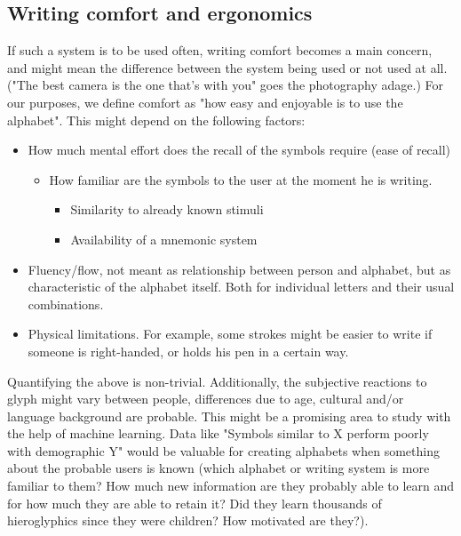 \documentclass{vgtc}                          %
\begin{document}
\subsection{Writing comfort and ergonomics}
If such a system is to be used often, writing comfort becomes a main concern, and might mean the difference between the system being used or not used at all. 
("The best camera is the one that's with you" goes the photography adage.) %
For our purposes, we define comfort as "how easy and enjoyable is to use the alphabet". This might depend on the following factors:
\begin{itemize}
        \item How much mental effort does the recall of the symbols require (ease of recall)
                \begin{itemize}
                        \item How familiar are the symbols to the user at the moment he is writing. 
                                \begin{itemize}
                                        \item Similarity to already known stimuli
                                        \item Availability of a mnemonic system
                                \end{itemize}
                \end{itemize}
        \item Fluency/flow, not meant as relationship between person and alphabet, but as characteristic of the alphabet itself. Both for individual letters and their usual combinations.
        \item Physical limitations. For example, some strokes might be easier to write if someone is right-handed, or holds his pen in a certain way.
\end{itemize}


Quantifying the above is non-trivial.  Additionally, the subjective reactions to glyph might vary between people, differences due to age, cultural and/or language background are probable. This might be a promising area to study with the help of machine learning. Data like "Symbols similar to X perform poorly with demographic Y" would be valuable for creating alphabets when something about the probable users is known (which alphabet or writing system is more familiar to them? How much new information are they probably able to learn and for how much they are able to retain it? Did they learn thousands of hieroglyphics since they were children? How motivated are they?). 
\end{document}
